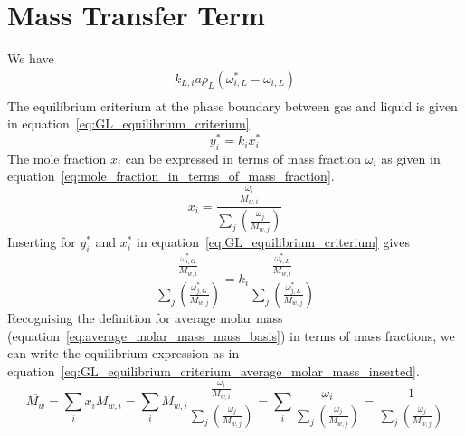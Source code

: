 \documentclass{article}
\begin{document}
\section{Mass Transfer Term}
We have
\begin{equation}
	\begin{split}
		k_{L,i}a\rho_L(\omega_{i,L}^*-\omega_{i,L}) \\
	\end{split}
\end{equation}
The equilibrium criterium at the phase boundary between gas and liquid is given in equation~\ref{eq:GL_equilibrium_criterium}.
\begin{equation}
	y_i^* = k_ix_i^*
	\label{eq:GL_equilibrium_criterium}
\end{equation}
The mole fraction $x_i$ can be expressed in terms of mass fraction $\omega_i$ as given in equation~\ref{eq:mole_fraction_in_terms_of_mass_fraction}.
\begin{equation}
	x_i = \frac{\frac{\omega_i}{M_{w,i}}}{\sum_j \left( \frac{\omega_j}{M_{w,j}}\right)}
	\label{eq:mole_fraction_in_terms_of_mass_fraction}
\end{equation}
Inserting for $y_i^*$ and $x_i^*$ in equation~\ref{eq:GL_equilibrium_criterium} gives
\begin{equation}
	\frac{\frac{\omega_{i,G}^*}{M_{w,i}}}{\sum_j \left( \frac{\omega_{j,G}^*}{M_{w,j}}\right)} = k_i\frac{\frac{\omega_{i,L}^*}{M_{w,i}}}{\sum_j \left( \frac{\omega_{j,L}^*}{M_{w,j}}\right)} 
	\label{eq:GL_equilibrium_criterium_mass_fractions_inserted}
\end{equation}
Recognising the definition for average molar mass (equation~\ref{eq:average_molar_mass_mass_basis}) in terms of mass fractions, we can write the equilibrium expression as in equation~\ref{eq:GL_equilibrium_criterium_average_molar_mass_inserted}.
\begin{equation}
	\overline{M_{w}} = \sum_i x_i M_{w,i}= \sum_iM_{w,i}\frac{\frac{\omega_i}{M_{w,i}}}{\sum_j \left( \frac{\omega_j}{M_{w,j}}\right)} = \sum_i\frac{\omega_i}{\sum_j \left( \frac{\omega_j}{M_{w,j}}\right)}=\frac{1}{\sum_j \left( \frac{\omega_j}{M_{w,j}}\right)}
	\label{eq:average_molar_mass_mass_basis}
\end{equation}
\end{document}
